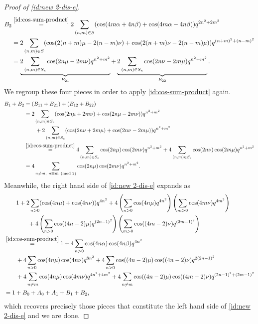 \documentclass[11pt,reqno]{amsart}
\numberwithin{equation}{section}
\theoremstyle{plain}
\theoremstyle{definition}
\theoremstyle{named}
\begin{document}
\begin{proof}[Proof of \eqref{id:new 2-dis-e}]
\begin{align*}
B_2 &\stackrel{\eqref{id:cos-sum-product}}{=} 2\sum_{(n,m)\in S}(\cos(4m\alpha+4n\beta)+\cos(4m\alpha-4n\beta))q^{2n^2+2m^2}\\
&= 2\sum_{(n,m)\in S}(\cos(2(n+m)\mu-2(n-m)\nu)+\cos(2(n+m)\nu-2(n-m)\mu))q^{(n+m)^2+(n-m)^2}\\
&= \underbrace{2\sum_{(n,m)\in S_e}\cos(2n\mu-2m\nu)q^{n^2+m^2}}_{B_{21}}+\underbrace{2\sum_{(n,m)\in S_e}\cos(2n\nu-2m\mu)q^{n^2+m^2}}_{B_{22}}.
\end{align*}
We regroup these four pieces in order to apply \eqref{id:cos-sum-product} again.
\begin{align*}
B_1+B_2 &= (B_{11}+B_{21})+(B_{12}+B_{22})\\
&= 2\sum_{(n,m)\in S_e}(\cos(2n\mu+2m\nu)+\cos(2n\mu-2m\nu))q^{n^2+m^2}\\
&\qquad +2\sum_{(n,m)\in S_e}(\cos(2n\nu+2m\mu)+\cos(2n\nu-2m\mu))q^{n^2+m^2}\\
&\stackrel{\eqref{id:cos-sum-product}}{=}4\sum_{(n,m)\in S_e}\cos(2n\mu)\cos(2m\nu)q^{n^2+m^2}+4\sum_{(n,m)\in S_e}\cos(2n\nu)\cos(2m\mu)q^{n^2+m^2}\\
&=4\sum_{n\neq m,~n\equiv m\pmod 2}\cos(2n\mu)\cos(2m\nu)q^{n^2+m^2}.
\end{align*}
Meanwhile, the right hand side of \eqref{id:new 2-dis-e} expands as
\begin{align*}
&\qquad 1+2\sum_{n>0}(\cos(4n\mu)+\cos(4n\nu))q^{4n^2}+4\left(\sum_{n>0}\cos(4n\mu)q^{4n^2}\right)\left(\sum_{m>0}\cos(4m\nu)q^{4m^2}\right)\\
&\qquad\qquad +4\left(\sum_{n>0}\cos((4n-2)\mu)q^{(2n-1)^2}\right)\left(\sum_{m>0}\cos((4m-2)\nu)q^{(2m-1)^2}\right)\\
&\stackrel{\eqref{id:cos-sum-product}}{=}1+4\sum_{n>0}\cos(4n\alpha)\cos(4n\beta)q^{4n^2}\\
&\qquad+4\sum_{n>0}\cos(4n\mu)\cos(4n\nu)q^{8n^2}+4\sum_{n>0}\cos((4n-2)\mu)\cos((4n-2)\nu)q^{2(2n-1)^2}\\
&\qquad +4\sum_{n\neq m}\cos(4n\mu)\cos(4m\nu)q^{4n^2+4m^2}+4\sum_{n\neq m}\cos((4n-2)\mu)\cos((4m-2)\nu)q^{(2n-1)^2+(2m-1)^2}\\
&=1+B_0+A_0+A_1+B_1+B_2,
\end{align*}
which recovers precisely those pieces that constitute the left hand side of \eqref{id:new 2-dis-e} and we are done.
\end{proof}
\end{document}
